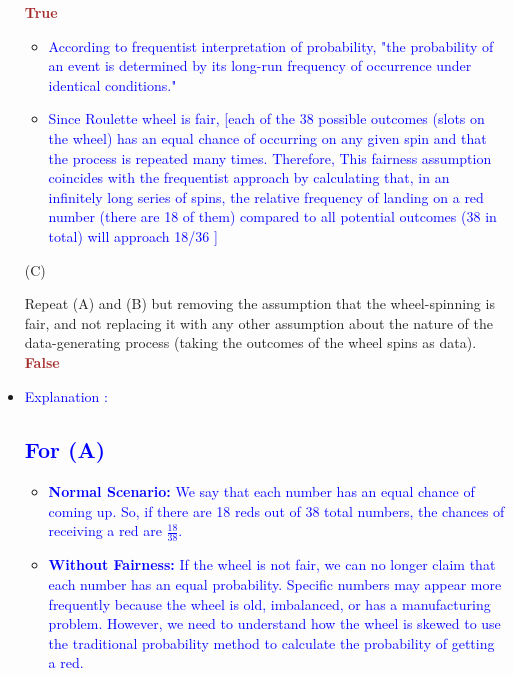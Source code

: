 \documentclass[12pt]{article}
\begin{document}
\begin{itemize}
\textcolor{brown}{\textbf{True}}
    \begin{itemize}

              \item \textcolor{blue}{According to frequentist interpretation of probability, "the probability of an event is determined by its long-run frequency of occurrence under identical conditions."}
           \item \textcolor{blue}{Since Roulette wheel is fair, [each of the 38 possible outcomes (slots on the wheel) has an equal chance of occurring on any given spin and that the process is repeated many times. Therefore, This fairness assumption coincides with the frequentist approach by calculating that, in an infinitely long series of spins, the relative frequency of landing on a red number (there are 18 of them) compared to all potential outcomes (38 in total) will approach 18/36 ]}
    
    \end{itemize}
    
\item[(C)]

Repeat (A) and (B) but removing the assumption that the wheel-spinning is fair, and not replacing it with any other assumption about the nature of the data-generating process (taking the outcomes of the wheel spins as data). 
    \textcolor{brown}{\textbf{False}}
    \item \textcolor{blue}{Explanation :}
   \subsection*{\textcolor{blue}{\textbf{For (A)}}}

\begin{itemize}
    \item \textbf{\textcolor{blue}{Normal Scenario:}} \textcolor{blue}{We say that each number has an equal chance of coming up. So, if there are 18 reds out of 38 total numbers, the chances of receiving a red are $\frac{18}{38}$.}
    \item \textbf{\textcolor{blue}{Without Fairness:}} \textcolor{blue}{If the wheel is not fair, we can no longer claim that each number has an equal probability. Specific numbers may appear more frequently because the wheel is old, imbalanced, or has a manufacturing problem. However, we need to understand how the wheel is skewed to use the traditional probability method to calculate the probability of getting a red.}
\end{itemize}


\end{itemize}
\end{document}

